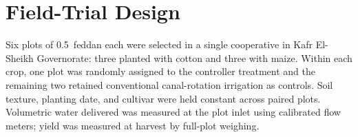 \section{Field-Trial Design}
Six plots of 0.5~feddan each were selected in a single cooperative in Kafr El-Sheikh
Governorate: three planted with cotton and three with maize. Within each crop, one plot was
randomly assigned to the controller treatment and the remaining two retained conventional
canal-rotation irrigation as controls. Soil texture, planting date, and cultivar were held
constant across paired plots. Volumetric water delivered was measured at the plot inlet using
calibrated flow meters; yield was measured at harvest by full-plot weighing.

